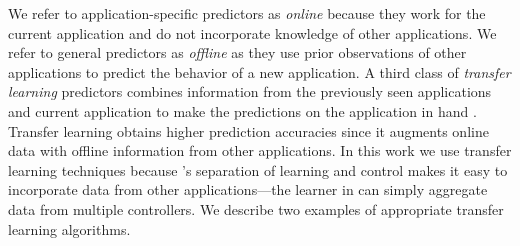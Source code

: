 We refer to application-specific predictors as \emph{online} because
they work for the current application and do not incorporate knowledge
of other applications.  We refer to general predictors as
\emph{offline} as they use prior observations of other applications to
predict the behavior of a new application. A third class of
\emph{transfer learning} predictors combines information from the
previously seen applications and current application to make the
predictions on the application in hand \cite{pan2010survey}. Transfer
learning obtains higher prediction accuracies since it augments online
data with offline information from other applications.  In this work
we use transfer learning techniques because \SYSTEM{}'s separation of
learning and control makes it easy to incorporate data from other
applications---the learner in  can simply
aggregate data from multiple controllers. We describe two examples of
appropriate transfer learning algorithms.


